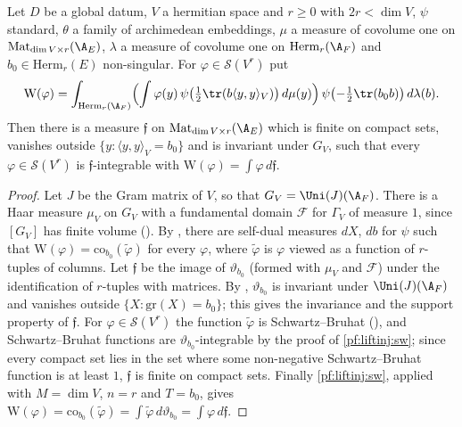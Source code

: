 \begin{proposition}\label{pf:liftinj:fib}
Let $D$ be a global datum, $V$ a hermitian space and $r\ge0$ with $2r<\dim V$, $\psi$ standard, $\theta$ a family of archimedean embeddings, $\mu$
a measure of covolume one on $\mathrm{Mat}_{\dim V\times r}(\A_E)$, $\lambda$ a measure of covolume one on $\mathrm{Herm}_r(\A_F)$ and
$b_0\in\mathrm{Herm}_r(E)$ non-singular. For $\varphi\in\mathcal S(V^r)$ put
\[
\mathrm W(\varphi)=\int_{\mathrm{Herm}_r(\A_F)}\Bigl(\int\varphi(y)\,\psi\bigl(\tfrac12\tr(b\langle y,y\rangle_V)\bigr)\,d\mu(y)\Bigr)\,
\psi\bigl(-\tfrac12\tr(b_0b)\bigr)\,d\lambda(b).
\]
Then there is a measure $\mathfrak f$ on $\mathrm{Mat}_{\dim V\times r}(\A_E)$ which is finite on compact sets, vanishes outside
$\{y:\langle y,y\rangle_V=b_0\}$ and is invariant under $G_V$, such that every $\varphi\in\mathcal S(V^r)$ is $\mathfrak f$-integrable with
$\mathrm W(\varphi)=\int\varphi\,d\mathfrak f$.
\end{proposition}

\begin{proof}
Let $J$ be the Gram matrix of $V$, so that $G_V=\Uni(J)(\A_F)$. There is a Haar measure $\mu_V$ on $G_V$ with a fundamental domain $\mathcal F$ for
$\Gamma_V$ of measure $1$, since $[G_V]$ has finite volume \cite{Borel1963} ().
By , there are self-dual measures $dX$, $db$ for $\psi$ such that
$\mathrm W(\varphi)=\mathrm{co}_{b_0}(\tilde\varphi)$ for every $\varphi$, where $\tilde\varphi$ is $\varphi$ viewed as a function of $r$-tuples of
columns. Let $\mathfrak f$ be the image of $\vartheta_{b_0}$ (formed with $\mu_V$ and $\mathcal F$) under the identification of $r$-tuples with
matrices. By , $\vartheta_{b_0}$ is invariant under $\Uni(J)(\A_F)$ and vanishes
outside $\{X:\mathrm{gr}(X)=b_0\}$; this gives the invariance and the support property of $\mathfrak f$. For $\varphi\in\mathcal S(V^r)$ the function
$\tilde\varphi$ is Schwartz--Bruhat (), and Schwartz--Bruhat functions are
$\vartheta_{b_0}$-integrable by the proof of \cref{pf:liftinj:sw}; since every compact set lies in the set where some non-negative
Schwartz--Bruhat function is at least $1$, $\mathfrak f$ is finite on compact sets. Finally \cref{pf:liftinj:sw}, applied with $M=\dim V$, $n=r$ and
$T=b_0$, gives $\mathrm W(\varphi)=\mathrm{co}_{b_0}(\tilde\varphi)=\int\tilde\varphi\,d\vartheta_{b_0}=\int\varphi\,d\mathfrak f$.
\end{proof}

